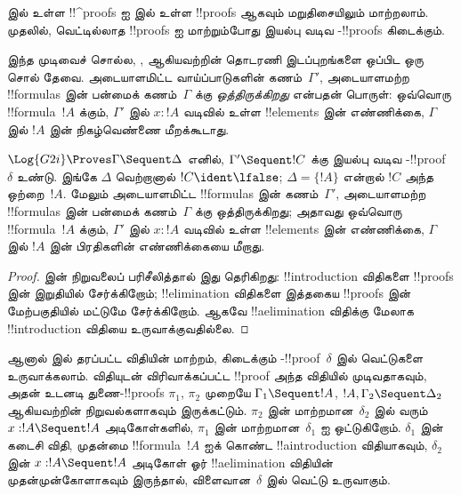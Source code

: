 \documentclass[../../../include/open-logic-section]{subfiles}
\begin{document}


 இல் உள்ள !!^{proof}s ஐ  இல் உள்ள
!!{proof}s ஆகவும் மறுதிசையிலும் மாற்றலாம். முதலில்,
வெட்டில்லாத  !!{proof}s ஐ மாற்றும்போது
இயல்பு வடிவ -!!{proof}s கிடைக்கும்.

இந்த முடிவைச் சொல்ல, , 
ஆகியவற்றின் தொடரணி இடப்புறங்களை ஒப்பிட ஒரு சொல்
தேவை. அடையாளமிட்ட வாய்ப்பாடுகளின் கணம்~$\Gamma'$,
அடையாளமற்ற !!{formula}s இன் பன்மைக் கணம்~$\Gamma$
க்கு \emph{ஒத்திருக்கிறது} என்பதன் பொருள்:
ஒவ்வொரு !!{formula}~$!A$ க்கும்,
$\Gamma'$ இல் $x : !A$ வடிவில் உள்ள !!{element}s
இன் எண்ணிக்கை, $\Gamma$ இல் $!A$ இன்
நிகழ்வெண்ணை மீறக்கூடாது.

\begin{cor}
$\Log{G2i} \Proves \Gamma \Sequent \Delta$ எனில்,
$\Gamma' \Sequent !C$ க்கு இயல்பு வடிவ
-!!{proof}~$\delta$ உண்டு. இங்கே
$\Delta$ வெற்றானால் $!C \ident \lfalse$;
$\Delta=\{!A\}$ என்றால் $!C$ அந்த ஒற்றை~$!A$.
மேலும் அடையாளமிட்ட !!{formula}s இன் கணம்~$\Gamma'$,
அடையாளமற்ற !!{formula}s இன் பன்மைக் கணம்~$\Gamma$
க்கு ஒத்திருக்கிறது; அதாவது ஒவ்வொரு
!!{formula}~$!A$ க்கும், $\Gamma'$ இல்
$x : !A$ வடிவில் உள்ள !!{element}s இன் எண்ணிக்கை,
$\Gamma$ இல் $!A$ இன் பிரதிகளின் எண்ணிக்கையை
மீறாது.
\end{cor}

\begin{proof}
 இன்
நிறுவலைப் பரிசீலித்தால் இது தெரிகிறது:
!!{introduction} விதிகளை !!{proof}s இன்
இறுதியில் சேர்க்கிறோம்; !!{elimination} விதிகளை
இத்தகைய !!{proof}s இன் மேற்பகுதியில் மட்டுமே சேர்க்கிறோம்.
ஆகவே !!a{elimination} விதிக்கு மேலாக
!!{introduction} விதியை உருவாக்குவதில்லை.
\end{proof}

ஆனால்  இல்
தரப்பட்ட \Cut{} விதியின் மாற்றம், கிடைக்கும்
-!!{proof}~$\delta$ இல் வெட்டுகளை
உருவாக்கலாம். \Cut{} விதியுடன் விரிவாக்கப்பட்ட
 !!{proof} அந்த விதியில் முடிவதாகவும்,
அதன் உடனடி துணை-!!{proof}s $\pi_1$, $\pi_2$
முறையே $\Gamma_1 \Sequent !A$,
$!A, \Gamma_2 \Sequent \Delta_2$ ஆகியவற்றின்
நிறுவல்களாகவும் இருக்கட்டும். $\pi_2$ இன்
மாற்றமான~$\delta_2$ இல் வரும்
$x:!A \Sequent !A$ அடிகோள்களில், $\pi_1$
இன் மாற்றமான~$\delta_1$ ஐ ஒட்டுகிறோம்.
$\delta_1$ இன் கடைசி விதி, முதன்மை
!!{formula}~$!A$ ஐக் கொண்ட
!!a{introduction} விதியாகவும், $\delta_2$
இன் $x:!A \Sequent !A$ அடிகோள் ஓர்
!!a{elimination} விதியின் முதன்முன்கோளாகவும்
இருந்தால், விளைவான~$\delta$ இல் வெட்டு உருவாகும்.
\end{document}
